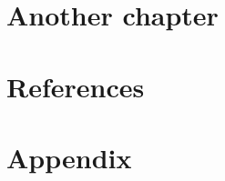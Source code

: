 \documentclass[headsepline,titlepage,twoside,12pt]{scrreprt}
\begin{document}
\chapter{Another chapter}\label{ch:anotherchapter}


\chapter{References}\label{ch:references}



\chapter{Appendix}\label{ch:appendix}
\end{document}
